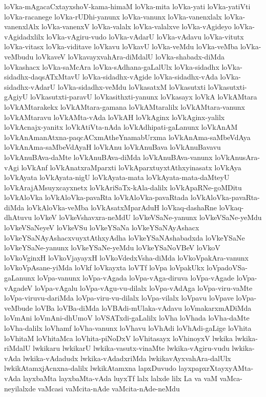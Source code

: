 {loVka-mAgacaCxtayxshoV-kama-himaM
loVka-mita
loVka-yati
loVka-yatiVti
loVka-racanege
loVka-rUDhi-yanunx
loVka-vanunx
loVka-vanenxlalx
loVka-vanenxlAlx
loVka-vanenxV
loVka-valalx
loVka-valalxve
loVka-vAgideyo
loVka-vAgidadxlilx
loVka-vAgiru-vudo
loVka-vAdarU
loVka-vAdavu
loVka-vitutx
loVka-vitasx
loVka-viditave
loVkavu
loVkavU
loVka-veMdu
loVka-veMba
loVka-veMbudu
loVkaveV
loVkavayxvahAra-diMdalU
loVka-shabadx-diMda
loVkashacx
loVka-saMcAra
loVka-sAdhana-gaLalUlx
loVka-sidadhx
loVka-sidadhx-daqsATxMtavU
loVka-sidadhx-vAgide
loVka-sidadhx-vAda
loVka-sidadhx-vAdarU
loVka-sidadhx-veMdu
loVkasatxM
loVkasutxti
loVkasutxti-gAgiyU
loVkasutxti-paravU
loVkasithxti-yanunx
loVkasayx
loVkA
loVkAMtara
loVkAMtarakekx
loVkAMtara-gamana
loVkAMtaralilx
loVkAMtara-vanunx
loVkAMtaravu
loVkAMta-vAda
loVkAH
loVkAginx
loVkAginx-yalilx
loVkAcnajx-yanitx
loVkAtiVta-nAda
loVkAdhipati-gaLanunx
loVkAnAM
loVkAnAmanAtxna-paqcACxmAtheYnamabUrxma
loVkAnAma-saMbeVdAya
loVkAnAma-saMbeVdAyaH
loVkAnu
loVkAnuBava
loVkAnuBavavu
loVkAnuBAva-daMte
loVkAnuBAva-diMda
loVkAnuBAva-vanunx
loVkAnusAra-vAgi
loVkAnf
loVkAnatxraMparxti
loVkAparxtuyxtAthxyinasatx
loVkAya
loVkAyata
loVkAyata-nigU
loVkAyata-mata
loVkAyata-mata-daMteyU
loVkArajAMsuyxcayxnetx
loVkAriSaTx-kAla-dalilx
loVkApaRNe-goMDitu
loVkAloVka
loVkAloVka-pavaRta
loVkAloVka-pavaRtada
loVkAloVka-pavaRta-diMda
loVkAloVka-veMba
loVkAsatxMparAduH
loVkaq-dashaRne
loVkaq-dhAtuvu
loVkeV
loVkeVshavxra-neMdU
loVkeVSaNe-yanunx
loVkeVSaNe-yeMdu
loVkeVSaNeyeV
loVkeVSu
loVkeYSaNa
loVkeYSaNAyAshacx
loVkeYSaNAyAshacxvuyxtAthxyAdha
loVkeYSaNAshabadxda
loVkeYSaNe
loVkeYSaNe-yanunx
loVkeYSaNe-yeMdu
loVkeYSaNoVBeV
loVkoV
loVkoVginxH
loVkoVjayayxH
loVkoVdedxVsha-diMda
loVkoVpakAra-vanunx
loVkoVpAsane-yiMda
loVkf
loVkayxta
loVTf
loVpa
loVpakUkx
loVpadoVSa-gaLanunx
loVpa-vanunx
loVpa-vAgada
loVpa-vAga-diruva
loVpa-vAgade
loVpa-vAgadeV
loVpa-vAgalu
loVpa-vAgu-vu-dilalx
loVpa-vAdAga
loVpa-viru-vaMte
loVpa-viruvu-dariMda
loVpa-viru-vu-dilalx
loVpa-vilalx
loVpavu
loVpave
loVpa-veMbude
loVBa
loVBa-diMda
loVBAdi-mUlaka-vAdavu
loVmakarxmADiMda
loVmAni
loVmAni-dhUmoV
loVSATxdi-gaLalilx
loVha
loVhada
loVha-daMte
loVha-dalilx
loVhamf
loVha-vanunx
loVhavu
loVhAdi
loVhAdi-gaLige
loVhita
loVhitaM
loVhitaMca
loVhita-piNoDxV
loVhitasayx
loVhinoyxV
lwkika
lwkika-riMdalU
lwkikaru
lwkikarU
lwkika-vasutx-vinaMte
lwkika-vAgiru-vudu
lwkika-vAda
lwkika-vAdadudx
lwkika-vAdadxriMda
lwkikavAyxvahAra-dalUlx
lwkikAtamxjAcnxna-dalilx
lwkikAtamxna
lapxDuvudo
layxpapxrXtayxyAMta-vAda
layxbaMta
layxbaMta-vAda
luyxTf
lalx
lalxde
lilx
La
va
vaM
vaMca-neyilalxde
vaMcasi
vaMcita-nAde
vaMcita-nAde-neMdu
}
